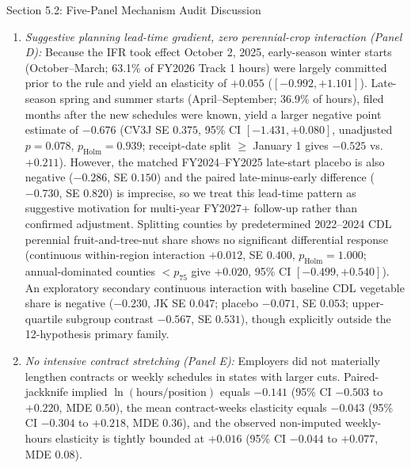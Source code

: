 \begin{llmdraft}{Section 5.2: Five-Panel Mechanism Audit Discussion}
\begin{enumerate}
    businesses covering 85.0\% of all Track 1 hours) and exhibit a statutory
    elasticity of $-0.086$ (95\%
    CI $[-0.866, +0.694]$; placebo $+0.113$). New-entrant business hours
    ($-0.213$, 95\% CI $[-4.275, +3.849]$) and distinct active business counts
    ($+0.444$, 95\% CI $[-1.070, +1.958]$) are too volatile over one season to
    detect entry effects, and the paired entrant-minus-incumbent contrast is
    indistinguishable from zero ($-0.127$, SE $2.370$; R7 filer sensitivity
    $-2.551$, SE $1.537$, placebo $+1.111$).
  \item \emph{Suggestive planning lead-time gradient, zero perennial-crop
    interaction (Panel D):} Because the IFR took effect October 2, 2025,
    early-season winter starts (October--March; 63.1\% of FY2026 Track 1 hours)
    were largely committed prior to the rule and yield an elasticity of
    $+0.055$ ($[-0.992, +1.101]$). Late-season spring and summer starts
    (April--September; 36.9\% of hours), filed months after the new schedules
    were known, yield a larger negative point estimate of $-0.676$ (CV3J SE
    $0.375$, 95\% CI $[-1.431, +0.080]$, unadjusted $p=0.078$,
    $p_{\text{Holm}}=0.939$; receipt-date split $\ge$ January 1 gives $-0.525$
    vs.\ $+0.211$). However, the matched FY2024--FY2025 late-start placebo is
    also negative ($-0.286$, SE $0.150$) and the paired late-minus-early
    difference ($-0.730$, SE $0.820$) is imprecise, so we treat this lead-time
    pattern as suggestive motivation for multi-year FY2027+ follow-up rather
    than confirmed adjustment. Splitting counties by predetermined 2022--2024
    CDL perennial fruit-and-tree-nut share shows no significant differential
    response (continuous within-region interaction $+0.012$, SE $0.400$,
    $p_{\text{Holm}}=1.000$; annual-dominated counties $<p_{75}$ give $+0.020$,
    95\% CI $[-0.499, +0.540]$). An exploratory secondary continuous
    interaction with baseline CDL vegetable share is negative ($-0.230$, JK SE
    $0.047$; placebo $-0.071$, SE $0.053$; upper-quartile subgroup contrast
    $-0.567$, SE $0.531$), though explicitly outside the 12-hypothesis primary
    family.
  \item \emph{No intensive contract stretching (Panel E):} Employers did not
    materially lengthen contracts or weekly schedules in states with larger
    cuts. Paired-jackknife implied $\ln(\text{hours/position})$ equals
    $-0.141$ (95\% CI $-0.503$ to $+0.220$, MDE $0.50$), the mean
    contract-weeks elasticity equals $-0.043$ (95\% CI $-0.304$ to $+0.218$,
    MDE $0.36$), and the observed non-imputed weekly-hours elasticity is
    tightly bounded at $+0.016$ (95\% CI $-0.044$ to $+0.077$, MDE $0.08$).
\end{enumerate}
\end{llmdraft}

